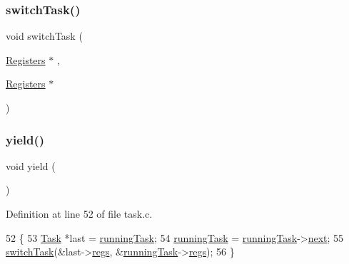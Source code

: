 \mbox{\label{a00056_a2425ca34147fccde2d1503332d21c5bd_a2425ca34147fccde2d1503332d21c5bd}} 
\subsubsection{\texorpdfstring{switch\+Task()}{switchTask()}}
{\footnotesize\ttfamily void switch\+Task (\begin{DoxyParamCaption}\item[{\hyperlink{a00138}{Registers} $\ast$}]{,  }\item[{\hyperlink{a00138}{Registers} $\ast$}]{ }\end{DoxyParamCaption})}

\mbox{\label{a00056_a58c8b2ad0ea491a6642e5e1cbd358c89_a58c8b2ad0ea491a6642e5e1cbd358c89}} 
\subsubsection{\texorpdfstring{yield()}{yield()}}
{\footnotesize\ttfamily void yield (\begin{DoxyParamCaption}{ }\end{DoxyParamCaption})}



Definition at line 52 of file task.\+c.


\begin{DoxyCode}
52              \{
53     \hyperlink{a00142}{Task} *last = \hyperlink{a00053_a2c195d425b4a6791b3a89f7b219f93d9_a2c195d425b4a6791b3a89f7b219f93d9}{runningTask};
54     \hyperlink{a00053_a2c195d425b4a6791b3a89f7b219f93d9_a2c195d425b4a6791b3a89f7b219f93d9}{runningTask} = \hyperlink{a00053_a2c195d425b4a6791b3a89f7b219f93d9_a2c195d425b4a6791b3a89f7b219f93d9}{runningTask}->\hyperlink{a00142_a8b6b50960a19f7bae344ef0cc8ec4e7d_a8b6b50960a19f7bae344ef0cc8ec4e7d}{next};
55     \hyperlink{a00056_a2425ca34147fccde2d1503332d21c5bd_a2425ca34147fccde2d1503332d21c5bd}{switchTask}(&last->\hyperlink{a00142_a136b243ee52ff89e9ba97f4e4dba19bb_a136b243ee52ff89e9ba97f4e4dba19bb}{regs}, &\hyperlink{a00053_a2c195d425b4a6791b3a89f7b219f93d9_a2c195d425b4a6791b3a89f7b219f93d9}{runningTask}->\hyperlink{a00142_a136b243ee52ff89e9ba97f4e4dba19bb_a136b243ee52ff89e9ba97f4e4dba19bb}{regs});
56 \}
\end{DoxyCode}
